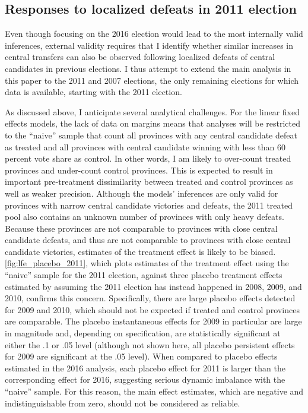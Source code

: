 \documentclass[12pt]{article}
\newcommand{\1}{\mathbbm{1}}
\begin{document}
\subsection{Responses to localized defeats in 2011 election}

Even though focusing on the 2016 election would lead to the most internally valid inferences, external validity requires that I identify whether similar increases in central transfers can also be observed following localized defeats of central candidates in previous elections. I thus attempt to extend the main analysis in this paper to the 2011 and 2007 elections, the only remaining elections for which data is available, starting with the 2011 election.

As discussed above, I anticipate several analytical challenges. For the linear fixed effects models, the lack of data on margins means that analyses will be restricted to the ``naive'' sample that count all provinces with any central candidate defeat as treated and all provinces with central candidate winning with less than 60 percent vote share as control. In other words, I am likely to over-count treated provinces and under-count control provinces. This is expected to result in important pre-treatment dissimilarity between treated and control provinces as well as weaker precision. Although the models' inferences are only valid for provinces with narrow central candidate victories and defeats, the 2011 treated pool also contains an unknown number of provinces with only heavy defeats. Because these provinces are not comparable to provinces with close central candidate defeats, and thus are not comparable to provinces with close central candidate victories, estimates of the treatment effect is likely to be biased. \autoref{fig:lfe_placebo_2011}, which plots estimates of the treatment effect using the ``naive'' sample for the 2011 election, against three placebo treatment effects estimated by assuming the 2011 election has instead happened in 2008, 2009, and 2010, confirms this concern. Specifically, there are large placebo effects detected for 2009 and 2010, which should not be expected if treated and control provinces are comparable. The placebo instantaneous effects for 2009 in particular are large in magnitude and, depending on specification, are statistically significant at either the .1 or .05 level (although not shown here, all placebo persistent effects for 2009 are significant at the .05 level). When compared to placebo effects estimated in the 2016 analysis, each placebo effect for 2011 is larger than the corresponding effect for 2016, suggesting serious dynamic imbalance with the ``naive'' sample. For this reason, the main effect estimates, which are negative and indistinguishable from zero, should not be considered as reliable.
\end{document}
